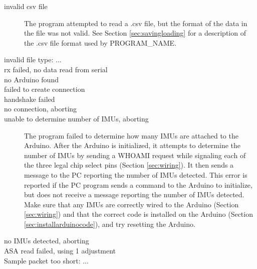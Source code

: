 \documentclass[11pt,letterpaper,article]{memoir}
\newcommand{\name}{PROGRAM_NAME}
\begin{document}
\begin{description}
\item[invalid csv file] The program attempted to read a .csv file, but the
format of the data in the file was not valid. See Section
\ref{sec:savingloading} for a description of the .csv file format used by
\name{}.

\item[invalid file type: ...]
\item[rx failed, no data read from serial]
\item[no Arduino found]
\item[failed to create connection]
\item[handshake failed]
\item[no connection, aborting]

\item[unable to determine number of IMUs, aborting] The program failed to
determine how many IMUs are attached to the Arduino. After the Arduino is
initialized, it attempts to determine the number of IMUs by sending a WHOAMI
request while signaling each of the three legal chip select pins (Section
\ref{sec:wiring}). It then sends a message to the PC reporting the number of
IMUs detected. This error is reported if the PC program sends a command to the
Arduino to initialize, but does not receive a message reporting the number of
IMUs detected. Make sure that any IMUs are correctly wired to the Arduino
(Section \ref{sec:wiring}) and that the correct code is installed on the Arduino
(Section \ref{sec:installarduinocode}), and try resetting the Arduino.

\item[no IMUs detected, aborting]

\item[ASA read failed, using 1 adjustment]

\item[Sample packet too short: ...]


\end{description}







%
%
\end{document}
